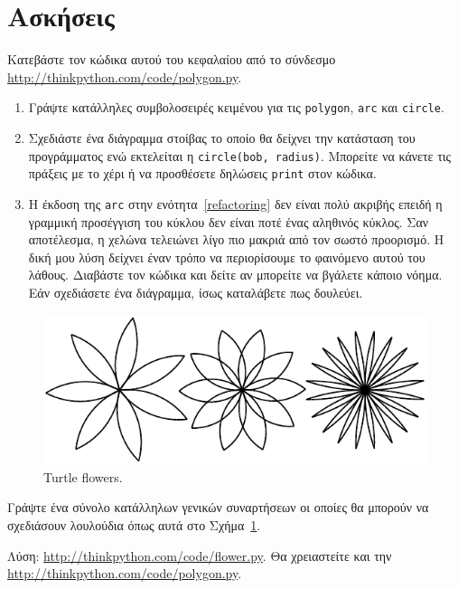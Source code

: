 \documentclass[10pt]{book}
\begin{document}
\section{Ασκήσεις}

\begin{exercise}

Κατεβάστε τον κώδικα αυτού του κεφαλαίου από το σύνδεσμο \url{http://thinkpython.com/code/polygon.py}.


\begin{enumerate}

\item Γράψτε κατάλληλες συμβολοσειρές κειμένου για τις {\tt polygon}, {\tt arc} και {\tt circle}. 

\item Σχεδιάστε ένα διάγραμμα στοίβας το οποίο θα δείχνει την κατάσταση του προγράμματος ενώ εκτελείται η  {\tt circle(bob, radius)}. 
Μπορείτε να κάνετε τις πράξεις με το χέρι ή να προσθέσετε δηλώσεις {\tt print} στον κώδικα.

\item Η έκδοση της  {\tt arc}  στην ενότητα~\ref{refactoring}  δεν είναι πολύ ακριβής επειδή η γραμμική προσέγγιση του κύκλου δεν είναι ποτέ ένας αληθινός κύκλος. Σαν αποτέλεσμα, η χελώνα τελειώνει λίγο πιο μακριά από τον σωστό προορισμό. Η δική μου λύση δείχνει έναν τρόπο να περιορίσουμε το φαινόμενο
αυτού του λάθους. Διαβάστε τον κώδικα και δείτε αν μπορείτε να βγάλετε κάποιο νόημα. Εάν σχεδιάσετε ένα διάγραμμα, ίσως καταλάβετε πως δουλεύει.
\\
\end{enumerate}

\end{exercise}

\begin{figure}
\centerline
{\includegraphics[scale=0.8]{figs/flowers.pdf}}
\caption{Turtle flowers.}
\label{fig.flowers}
\end{figure}


\begin{exercise}

Γράψτε ένα σύνολο κατάλληλων γενικών συναρτήσεων οι οποίες θα μπορούν να σχεδιάσουν λουλούδια όπως αυτά στο Σχήμα~\ref{fig.flowers}.

Λύση: \url{http://thinkpython.com/code/flower.py}. 
Θα χρειαστείτε και την \url{http://thinkpython.com/code/polygon.py}.
\\
\end{exercise}
\end{document}
